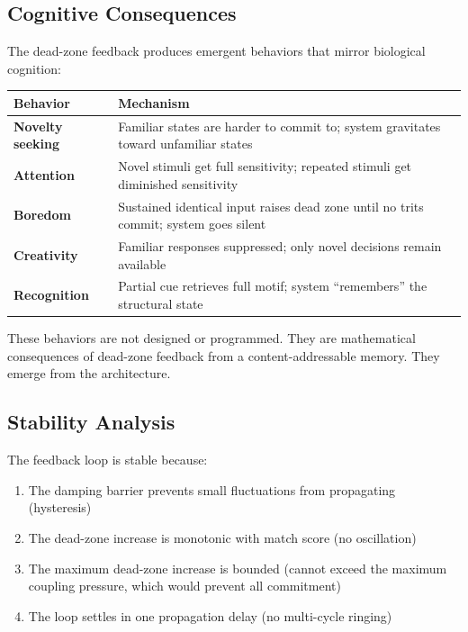 \documentclass[11pt, a4paper]{article}
\begin{document}
\subsection{Cognitive Consequences}

The dead-zone feedback produces emergent behaviors that mirror
biological cognition:

\begin{center}
\begin{tabular}{@{}lp{9cm}@{}}
\toprule
\textbf{Behavior} & \textbf{Mechanism} \\
\midrule
\textbf{Novelty seeking} & Familiar states are harder to commit
  to; system gravitates toward unfamiliar states \\
\textbf{Attention} & Novel stimuli get full sensitivity; repeated
  stimuli get diminished sensitivity \\
\textbf{Boredom} & Sustained identical input raises dead zone
  until no trits commit; system goes silent \\
\textbf{Creativity} & Familiar responses suppressed; only novel
  decisions remain available \\
\textbf{Recognition} & Partial cue retrieves full motif; system
  ``remembers'' the structural state \\
\bottomrule
\end{tabular}
\end{center}

These behaviors are not designed or programmed. They are
mathematical consequences of dead-zone feedback from a
content-addressable memory. They emerge from the architecture.

\subsection{Stability Analysis}

The feedback loop is stable because:
\begin{enumerate}[nosep]
  \item The damping barrier prevents small fluctuations from
        propagating (hysteresis)
  \item The dead-zone increase is monotonic with match score
        (no oscillation)
  \item The maximum dead-zone increase is bounded (cannot
        exceed the maximum coupling pressure, which would
        prevent all commitment)
  \item The loop settles in one propagation delay (no
        multi-cycle ringing)
\end{enumerate}
\end{document}
